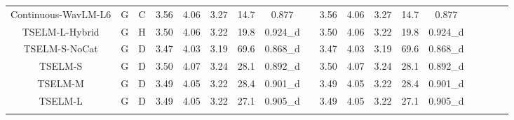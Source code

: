 \documentclass[conference]{IEEEtran}
\begin{document}
\begin{table}
\begin{center}
\begin{tabular}{cccccccccccccccccc}
  Continuous-WavLM-L6     & G                                             & C                                                                                  & 3.56        & 4.06       & 3.27       & 14.7            & 0.877     &          & 3.56        & 4.06       & 3.27       & 14.7            & 0.877             \\
  TSELM-L-Hybrid          & G                                             & H                                                                                     & 3.50        & 4.06       & 3.22       & 19.8            & 0.924\_d  &          & 3.50        & 4.06       & 3.22       & 19.8            & 0.924\_d             \\
  TSELM-S-NoCat       & G                                             & D                                                                                   & 3.47        & 4.03       & 3.19       & 69.6            & 0.868\_d    &        & 3.47        & 4.03       & 3.19       & 69.6            & 0.868\_d         \\ \hline
  TSELM-S                 & G                                             & D                                                                                    & 3.50        & 4.07       & 3.24       & 28.1            & 0.892\_d      &      & 3.50        & 4.07       & 3.24       & 28.1            & 0.892\_d            \\
  TSELM-M                 & G                                             & D                                                                                   & 3.49        & 4.05       & 3.22       & 28.4            & 0.901\_d    &        & 3.49        & 4.05       & 3.22       & 28.4            & 0.901\_d             \\
  TSELM-L                 & G                                             & D                                                                                  & 3.49        & 4.05       & 3.22       & 27.1            & 0.905\_d    &        & 3.49        & 4.05       & 3.22       & 27.1            & 0.905\_d        \\
  \Xhline{2\arrayrulewidth} %
  \end{tabular}
  \label{main_exp}
\end{center}
  \end{table}
\end{document}
